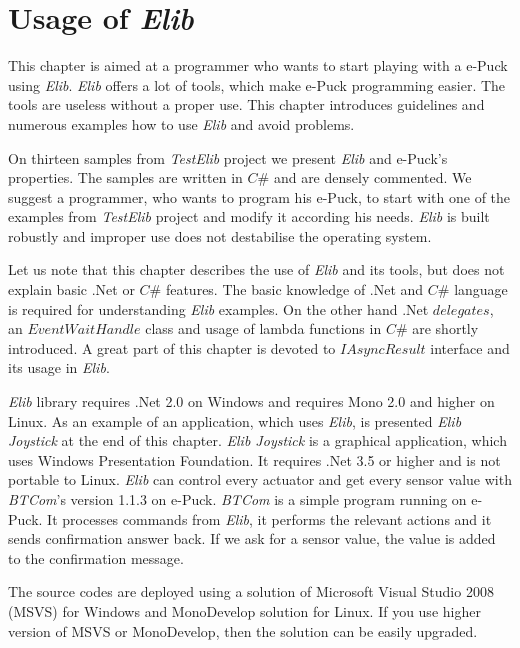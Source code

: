 \documentclass[12pt,notitlepage]{report}
\begin{document}
\chapter{Usage of {\it Elib}} \label{chap:usage}
	This chapter is aimed at a programmer who wants to start playing with a e-Puck using {\it Elib}. 
	{\it Elib} offers a lot of tools, which make e-Puck programming easier. 
	The tools are useless without a proper use. This chapter introduces guidelines and numerous
	examples how to use {\it Elib} and avoid problems.
	
	On thirteen samples from {\it TestElib} project we present {\it Elib} and e-Puck's properties.
	The samples are written in $C\#$ and are densely commented.
	We suggest a programmer, who wants to program his e-Puck, to start with one of the examples
	from {\it TestElib} project and modify it according his needs.
	{\it Elib} is built robustly and improper use does not destabilise the operating system.

	Let us note that this chapter describes the use of {\it Elib} and its tools,
	but does not explain basic .Net or $C\#$ features. The basic knowledge of .Net and $C\#$ language is required
	for understanding {\it Elib} examples. On the other hand .Net $delegates$, an $EventWaitHandle$ class and usage of lambda functions in $C\#$
	are shortly introduced. A great part of this chapter is devoted to $IAsyncResult$ interface and its
	usage in {\it Elib}.

	{\it Elib} library requires .Net 2.0 on Windows and requires Mono 2.0 %
	and higher on Linux.
	As an example of an application, which uses {\it Elib}, is presented {\it Elib Joystick} at the end of this chapter.
	{\it Elib Joystick} is a graphical application, which uses Windows Presentation Foundation. It requires .Net 3.5 or higher
	and is not portable to Linux.
	{\it Elib} can control every actuator and get every sensor value with {\it BTCom}'s version 1.1.3 on e-Puck. 
	{\it BTCom} is a simple program running on e-Puck. It processes commands from {\it Elib}, it performs the relevant actions
	and it sends confirmation answer back. If we ask for a sensor value, the value is added to the confirmation message.

	The source codes are deployed using a solution of Microsoft Visual Studio 2008 (MSVS) for Windows 
	and MonoDevelop solution for Linux.
	If you use higher version of MSVS or MonoDevelop, then the solution can be easily upgraded.	
\end{document}
